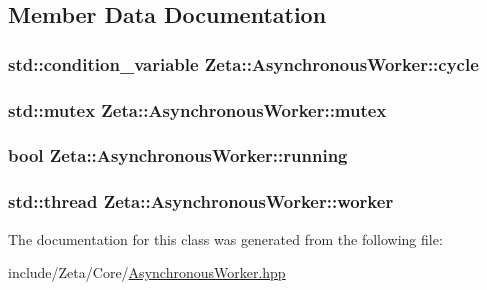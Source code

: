 \subsection{Member Data Documentation}
\hypertarget{classZeta_1_1AsynchronousWorker_af9d697955024d6a72c9d4bb977c10571}{
\subsubsection[{cycle}]{\setlength{\rightskip}{0pt plus 5cm}std\+::condition\+\_\+variable Zeta\+::\+Asynchronous\+Worker\+::cycle\hspace{0.3cm}{\ttfamily [private]}}}\label{classZeta_1_1AsynchronousWorker_af9d697955024d6a72c9d4bb977c10571}
\hypertarget{classZeta_1_1AsynchronousWorker_ae0ae2b7e721ff8c47bb67665523d9876}{
\subsubsection[{mutex}]{\setlength{\rightskip}{0pt plus 5cm}std\+::mutex Zeta\+::\+Asynchronous\+Worker\+::mutex\hspace{0.3cm}{\ttfamily [protected]}}}\label{classZeta_1_1AsynchronousWorker_ae0ae2b7e721ff8c47bb67665523d9876}
\hypertarget{classZeta_1_1AsynchronousWorker_a5ad6cb6f5b8abb7f9a9da695ef02e334}{
\subsubsection[{running}]{\setlength{\rightskip}{0pt plus 5cm}bool Zeta\+::\+Asynchronous\+Worker\+::running\hspace{0.3cm}{\ttfamily [private]}}}\label{classZeta_1_1AsynchronousWorker_a5ad6cb6f5b8abb7f9a9da695ef02e334}
\hypertarget{classZeta_1_1AsynchronousWorker_ae654cd21c700dc571aa2ed53bf291ee1}{
\subsubsection[{worker}]{\setlength{\rightskip}{0pt plus 5cm}std\+::thread Zeta\+::\+Asynchronous\+Worker\+::worker\hspace{0.3cm}{\ttfamily [private]}}}\label{classZeta_1_1AsynchronousWorker_ae654cd21c700dc571aa2ed53bf291ee1}


The documentation for this class was generated from the following file\+:\begin{DoxyCompactItemize}
\item 
include/\+Zeta/\+Core/\hyperlink{AsynchronousWorker_8hpp}{Asynchronous\+Worker.\+hpp}\end{DoxyCompactItemize}
